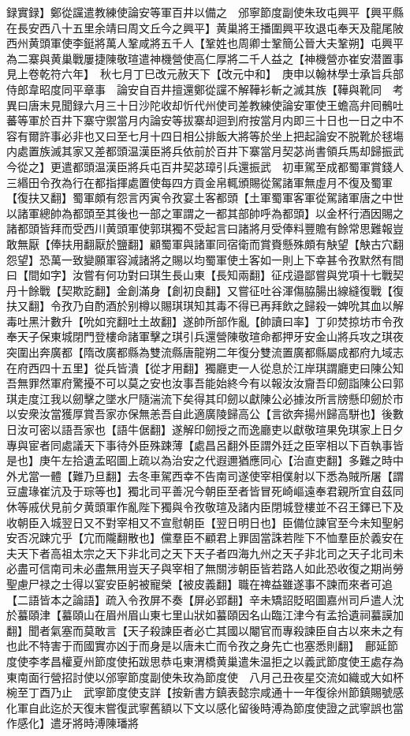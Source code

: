 録實録】鄭從讜遣教練使論安等軍百井以備之　邠寧節度副使朱玫屯興平【興平縣在長安西八十五里余靖曰周文丘今之興平】黄巢將王播圍興平玫退屯奉天及龍尾陂　西州黄頭軍使李鋌將萬人鞏咸將五千人【鞏姓也周卿士鞏簡公晉大夫鞏朔】屯興平為二寨與黄巢戰屢捷陳敬瑄遣神機營使高仁厚將二千人益之【神機營亦崔安潜置事見上卷乾符六年】　秋七月丁巳改元赦天下【改元中和】　庚申以翰林學士承旨兵部侍郎韋昭度同平章事　論安自百井擅還鄭從讜不解鞾衫斬之滅其族【鞾與靴同　考異曰唐末見聞録六月三十日沙陀收却忻代州使司差教練使論安軍使王蟾高弁囘鶻吐蕃等軍於百井下寨守禦當月内論安等拔寨却迴到府按當月内即三十日也一日之中不容有爾許事必非也又曰至七月十四日相公排飯大將等於坐上把起論安不脱靴於毬塲内處置族滅其家又差都頭温漢臣將兵依前於百井下寨當月契苾尚書領兵馬却歸振武今從之】更遣都頭温漢臣將兵屯百井契苾璋引兵還振武　初車駕至成都蜀軍賞錢人三緡田令孜為行在都指揮處置使每四方貢金帛輒頒賜從駕諸軍無虛月不復及蜀軍【復扶又翻】蜀軍頗有怨言丙寅令孜宴土客都頭【土軍蜀軍客軍從駕諸軍唐之中世以諸軍總帥為都頭至其後也一部之軍謂之一都其部帥呼為都頭】以金杯行酒因賜之諸都頭皆拜而受西川黄頭軍使郭琪獨不受起言曰諸將月受俸料豐贍有餘常思難報豈敢無厭【俸扶用翻厭於鹽翻】顧蜀軍與諸軍同宿衛而賞賚懸殊頗有觖望【觖古穴翻怨望】恐萬一致變願軍容減諸將之賜以均蜀軍使土客如一則上下幸甚令孜默然有間曰【間如字】汝嘗有何功對曰琪生長山東【長知兩翻】征戍邉鄙嘗與党項十七戰契丹十餘戰【契欺訖翻】金創滿身【創初良翻】又嘗征吐谷渾傷脇腸出線縫復戰【復扶又翻】令孜乃自酌酒於别樽以賜琪琪知其毒不得已再拜飲之歸殺一婢吮其血以解毒吐黑汁數升【吮如兖翻吐土故翻】遂帥所部作亂【帥讀曰率】丁卯焚掠坊市令孜奉天子保東城閉門登樓命諸軍擊之琪引兵還營陳敬瑄命都押牙安金山將兵攻之琪夜突圍出奔廣都【隋改廣都縣為雙流縣唐龍朔二年復分雙流置廣都縣屬成都府九域志在府西四十五里】從兵皆潰【從才用翻】獨廳吏一人從息於江岸琪謂廳吏曰陳公知吾無罪然軍府驚擾不可以莫之安也汝事吾能始終今有以報汝汝齎吾印劒詣陳公曰郭琪走度江我以劒擊之墜水尸隨湍流下矣得其印劒以獻陳公必據汝所言牓懸印劒於市以安衆汝當獲厚賞吾家亦保無恙吾自此適廣陵歸高公【言欲奔揚州歸高駢也】後數日汝可密以語吾家也【語牛倨翻】遂解印劒授之而逸廳吏以獻敬瑄果免琪家上日夕專與宦者同處議天下事待外臣殊踈薄【處昌呂翻外臣謂外廷之臣宰相以下百執事皆是也】庚午左拾遺孟昭圖上疏以為治安之代遐邇猶應同心【治直吏翻】多難之時中外尤當一體【難乃旦翻】去冬車駕西幸不告南司遂使宰相僕射以下悉為賊所屠【謂豆盧瑑崔沆及于琮等也】獨北司平善况今朝臣至者皆冒死崎嶇遠奉君親所宜自茲同休等戚伏見前夕黄頭軍作亂陛下獨與令孜敬瑄及諸内臣閉城登樓並不召王鐸已下及收朝臣入城翌日又不對宰相又不宣慰朝臣【翌日明日也】臣備位諫官至今未知聖躬安否况踈宂乎【宂而隴翻散也】儻羣臣不顧君上罪固當誅若陛下不恤羣臣於義安在夫天下者高祖太宗之天下非北司之天下天子者四海九州之天子非北司之天子北司未必盡可信南司未必盡無用豈天子與宰相了無關涉朝臣皆若路人如此恐收復之期尚勞聖慮尸禄之士得以宴安臣躬被寵榮【被皮義翻】職在禆益雖遂事不諫而來者可追【二語皆本之論語】疏入令孜屏不奏【屏必郢翻】辛未矯詔貶昭圖嘉州司戶遣人沈於蟇頤津【蟇頤山在眉州眉山東七里山狀如蟇頤因名山臨江津今有孟拾遺祠蟇謨加翻】聞者氣塞而莫敢言【天子殺諫臣者必亡其國以閹官而專殺諫臣自古以來未之有也此不特害于而國實亦凶于而身是以唐未亡而令孜之身先亡也塞悉則翻】　鄜延節度使李孝昌權夏州節度使拓跋思恭屯東渭橋黄巢遣朱温拒之以義武節度使王處存為東南面行營招討使以邠寧節度副使朱玫為節度使　八月己丑夜星交流如織或大如杯椀至丁酉乃止　武寧節度使支詳【按新書方鎮表懿宗咸通十一年復徐州節鎮賜號感化軍自此迄於天復末嘗復武寧舊額以下文以感化留後時溥為節度使證之武寧誤也當作感化】遣牙將時溥陳璠將